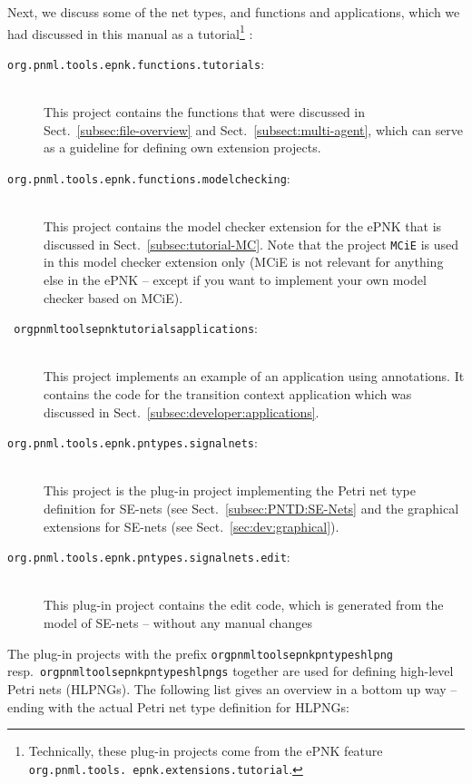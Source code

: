 Next, we discuss some of the net types, and functions and applications, which we
had discussed in this manual as a tutorial\footnote
  {Technically, these plug-in projects come from the ePNK feature
   {\tt org.pnml.tools. epnk.extensions.tutorial}.}%
:
\begin{description}
  \item[{\tt org.pnml.tools.epnk.functions.tutorials}:] ~\\
    This project contains the functions that were discussed in
    Sect.~\ref{subsec:file-overview} and Sect.~\ref{subsect:multi-agent},
    which can serve as a guideline for defining own extension projects.
    
  \item[{\tt org.pnml.tools.epnk.functions.modelchecking}:] ~\\
     This project
     contains the model checker extension%
     for the ePNK that is discussed in Sect.~\ref{subsec:tutorial-MC}. Note that
     the project {\tt MCiE} is used in this model checker extension only (MCiE
     is not relevant for anything else in the ePNK -- except if you want to
     implement your own model checker based on MCiE).

 \item[{\tt
 org\qnsep{}pnml\qnsep{}tools\qnsep{}epnk\qnsep{}tutorials\qnsep{}applications}:]  ~\\
    This project implements an example of an application%
    using annotations.%
    It contains the code for the transition context application which was
    discussed in Sect.~\ref{subsec:developer:applications}.
    
 \item[{\tt org.pnml.tools.epnk.pntypes.signalnets}:] ~\\
    This project is 
    the plug-in project implementing the Petri net type definition for SE-nets%
    (see Sect.~\ref{subsec:PNTD:SE-Nets} and the graphical extensions for
    SE-nets (see Sect.~\ref{sec:dev:graphical}).

\item[{\tt org.pnml.tools.epnk.pntypes.signalnets.edit}:] ~\\
    This plug-in project
    contains the edit code, which is generated from the model of SE-nets
    -- without any manual changes      
\end{description}

The plug-in projects with the prefix {\tt org\qnsep{}pnml\qnsep{}tools\qnsep{}epnk\qnsep{}pntypes\qnsep{}hlpng}
resp.\ {\tt org\qnsep{}pnml\qnsep{}tools\qnsep{}epnk\qnsep{}pntypes\qnsep{}hlpngs} together are used for defining
high-level Petri nets (HLPNGs).%
The following list gives an overview in a bottom
up way -- ending with the actual Petri net type definition for HLPNGs:

